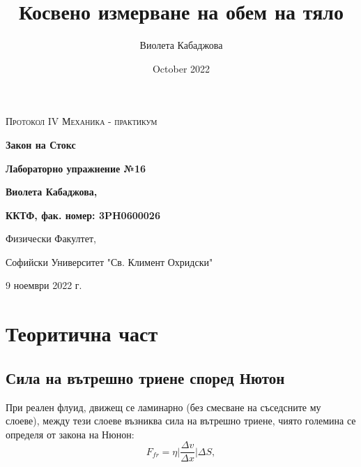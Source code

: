 \documentclass[12pt]{article}
\title{Косвено измерване на обем на тяло}
\author{Виолета Кабаджова}
\date{October 2022}
\begin{document}
\begin{titlepage}
	\flushleft
	{\scshape\Large Протокол IV \hspace{2cm} Механика - практикум\par}
	\vspace{5cm}
	{\huge\bfseries Закон на Стокс\par}
	\vspace{1cm}
	{\LARGE\bfseries Лабораторно упражнение №16\par}
	\vspace{5cm}
    {\LARGE\bfseries Виолета Кабаджова, \par}
    {\large\bfseries ККТФ, фак. номер: 3PH0600026\par}
	\vspace{1cm}
	
	{\large Физически Факултет, 
	
	Софийски Университет "Св. Климент Охридски"
	
	9 ноември 2022 г.\par}
	
\end{titlepage}

\section{Теоритична част}\label{sec:theoretical-part}
\subsection{Сила на вътрешно триене според Нютон}
При реален флуид, движещ се ламинарно (без смесване на съседсните му слоеве), между тези слоеве възниква сила на вътрешно триене, чиято големина се определя от закона на Нюнон:
\begin{equation}\label{eq:newton-friction}
    F_{fr} = \eta \Bigg |  \frac{\Delta v}{\Delta x} \Bigg | \Delta S,
\end{equation}
\end{document}
